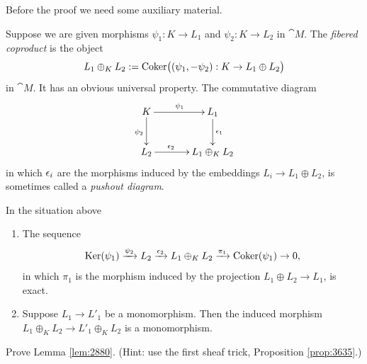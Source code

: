 Before the proof we need some auxiliary material. 

Suppose we are given morphisms $\psi_1 : K \to L_1$ and 
$\psi_2 : K \to L_2$ in $\cat{M}$. The {\em fibered coproduct} is the object 
\begin{equation} \label{eqn:2885}
L_1 \oplus_K L_2 := \operatorname{Coker} 
\bigl( (\psi_1, -\psi_2) : K \to L_1 \oplus L_2 \bigr) 
\end{equation}
in $\cat{M}$. 
It has an obvious universal property. The commutative diagram 
\begin{equation} \label{eqn:5072}
\UseTips \xymatrix @C=8ex @R=6ex {
K
\ar[r]^{\psi_1}
\ar[d]_{\psi_2}
&
L_1
\ar[d]^{\ep_1}
\\
L_2
\ar[r]^(0.37){\ep_2}
& 
L_1 \oplus_K L_2
} 
\end{equation}
in which $\epsilon_i$ are the morphisms induced by the embeddings 
$L_i \to L_1 \oplus L_2$, is sometimes called a {\em pushout diagram}. 

\begin{lem} \label{lem:2880}
In the situation above\tup{:}
\begin{enumerate}
\item The sequence
\[ \operatorname{Ker}(\psi_1) \xrightarrow{\psi_2} L_2 \xrightarrow{\epsilon_2} 
L_1 \oplus_K L_2 \xrightarrow{\pi_1} \operatorname{Coker}(\psi_1) \to 0 , \]
in which $\pi_1$ is the morphism induced by the projection 
$L_1 \oplus L_2 \to L_1$, is exact. 

\item Suppose $L_1 \to L'_1$ be a monomorphism. Then the induced morphism 
$L_1 \oplus_K L_2 \to L'_1 \oplus_K L_2$ 
is a monomorphism.
\end{enumerate}
\end{lem}

\begin{exer} \label{exer:2880}
Prove Lemma \ref{lem:2880}. (Hint: use the first sheaf trick,
Proposition \ref{prop:3635}.)  
\end{exer}

